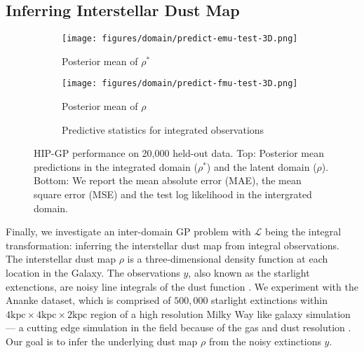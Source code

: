 \subsection{Inferring Interstellar Dust Map}

  
\label{sec:experiment-dustmap}
\begin{figure}[t!]
  \centering
  \begin{subfigure}{.49\columnwidth}
    \texttt{[image: figures/domain/predict-emu-test-3D.png]}
    \caption{Posterior mean of $\rho^*$}
    \label{fig:domain-predict-rhostar}
    \vspace{.5cm}
  \end{subfigure}
  \begin{subfigure}{.49\columnwidth}
    \texttt{[image: figures/domain/predict-fmu-test-3D.png]}
    \caption{Posterior mean of $\rho$}
		\label{fig:domain-predict-rho}
    	\vspace{.5cm}
  \end{subfigure}
  \begin{subfigure}{\columnwidth}
		\centering
    \scalebox{.8}{
    
    }
    \caption{Predictive statistics for integrated observations}
    \label{tab:domain-report}
  \end{subfigure}
	\caption{HIP-GP performance on 20{,}000 held-out data.
    Top: Posterior mean predictions in the integrated domain ($\rho^*$)
    and the latent domain ($\rho$).
    Bottom: We report the mean absolute error (MAE), the mean square error (MSE)
    and the test log likelihood in the intergrated domain.
  }
  \label{fig:domain-experiment}
\end{figure}

Finally, we investigate an inter-domain GP problem with $\mathcal{L}$ being the integral transformation:
inferring the interstellar dust map from integral observations.
The interstellar dust map $\rho$ is a three-dimensional density function at each location in the Galaxy.
The observations $y$, also known as the starlight extenctions, are noisy line
integrals of the dust function \citep{rezaei2017inferring}.
We experiment with the Ananke dataset,
which is comprised of $500{,}000$ starlight extinctions
within $4\textrm{kpc} \times 4 \textrm{kpc} \times 2 \textrm{kpc}$ region
 of a high resolution Milky Way like galaxy simulation --- a cutting edge simulation
 in the field because of the gas and dust resolution
  \citep{wetzel2016reconciling, hopkins2018fire, sanderson2020synthetic}.
Our goal is to infer the underlying dust map $\rho$
from the noisy extinctions $y$.

